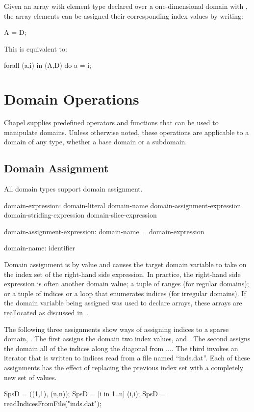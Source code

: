 \begin{example}
Given an array  with element type  declared over a
one-dimensional domain  with  , the
array elements can be assigned their corresponding index values by
writing:
\begin{chapel}
A = D;
\end{chapel}
This is equivalent to:
\begin{chapel}
forall (a,i) in (A,D) do
  a = i;
\end{chapel}
\end{example}


\section{Domain Operations}

Chapel supplies predefined operators and functions that can be used to manipulate
domains.  Unless otherwise noted, these operations are applicable to a domain of
any type, whether a base domain or a subdomain.

\subsection{Domain Assignment}
\label{Domain_Assignment}

All domain types support domain assignment.  

\begin{syntax}
domain-expression:
  domain-literal
  domain-name
  domain-assignment-expression
  domain-striding-expression
  domain-slice-expression


domain-assignment-expression:
  domain-name = domain-expression

domain-name:
  identifier
\end{syntax}

Domain assignment is by
value and causes the target domain variable to take on the index set
of the right-hand side expression.  In practice, the right-hand side
expression is often another domain value; a tuple of ranges (for
regular domains); or a tuple of indices or a loop that enumerates
indices (for irregular domains).  If the domain variable being
assigned was used to declare arrays, these arrays are reallocated as
discussed in~.

\begin{example}
The following three assignments show ways of assigning indices to a
sparse domain, .  The first assigns the domain two index
values,  and .  The second assigns the domain
all of the indices along the diagonal from
$\ldots$.  The third invokes an iterator that
is written to  indices read from a file named
``inds.dat''.  Each of these assignments has the effect of replacing
the previous index set with a completely new set of values.
\begin{chapel}
SpsD = ((1,1), (n,n));
SpsD = [i in 1..n] (i,i);
SpsD = readIndicesFromFile("inds.dat");
\end{chapel}
\end{example}

